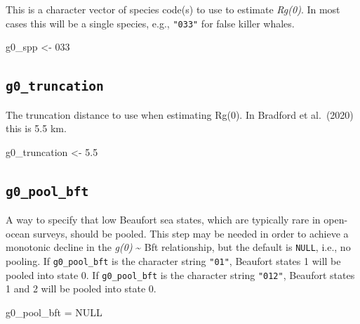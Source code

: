 \documentclass[
]{book}
\newenvironment{Shaded}{\begin{snugshade}}{\end{snugshade}}
\newcommand{\ConstantTok}[1]{\textcolor[rgb]{0.00,0.00,0.00}{#1}}
\newcommand{\FloatTok}[1]{\textcolor[rgb]{0.00,0.00,0.81}{#1}}
\newcommand{\NormalTok}[1]{#1}
\newcommand{\OtherTok}[1]{\textcolor[rgb]{0.56,0.35,0.01}{#1}}
\newcommand{\StringTok}[1]{\textcolor[rgb]{0.31,0.60,0.02}{#1}}
\begin{document}
This is a character vector of species code(s) to use to estimate \emph{Rg(0)}. In most cases this will be a single species, e.g., \texttt{"033"} for false killer whales.

\begin{Shaded}
\begin{Highlighting}[]
\NormalTok{g0\_spp }\OtherTok{\textless{}{-}} \StringTok{\textquotesingle{}033\textquotesingle{}}
\end{Highlighting}
\end{Shaded}

\hypertarget{g0_truncation}{%
\subsection*{\texorpdfstring{\texttt{g0\_truncation}}{g0\_truncation}}\label{g0_truncation}}

The truncation distance to use when estimating Rg(0). In Bradford et al.~(2020) this is 5.5 km.

\begin{Shaded}
\begin{Highlighting}[]
\NormalTok{g0\_truncation }\OtherTok{\textless{}{-}} \FloatTok{5.5}
\end{Highlighting}
\end{Shaded}

\hypertarget{g0_pool_bft}{%
\subsection*{\texorpdfstring{\texttt{g0\_pool\_bft}}{g0\_pool\_bft}}\label{g0_pool_bft}}

A way to specify that low Beaufort sea states, which are typically rare in open-ocean surveys, should be pooled. This step may be needed in order to achieve a monotonic decline in the \emph{g(0)} \textasciitilde{} Bft relationship, but the default is \texttt{NULL}, i.e., no pooling. If \texttt{g0\_pool\_bft} is the character string \texttt{"01"}, Beaufort states 1 will be pooled into state 0. If \texttt{g0\_pool\_bft} is the character string \texttt{"012"}, Beaufort states 1 and 2 will be pooled into state 0.

\begin{Shaded}
\begin{Highlighting}[]
\NormalTok{g0\_pool\_bft }\OtherTok{=} \ConstantTok{NULL}
\end{Highlighting}
\end{Shaded}
\end{document}
